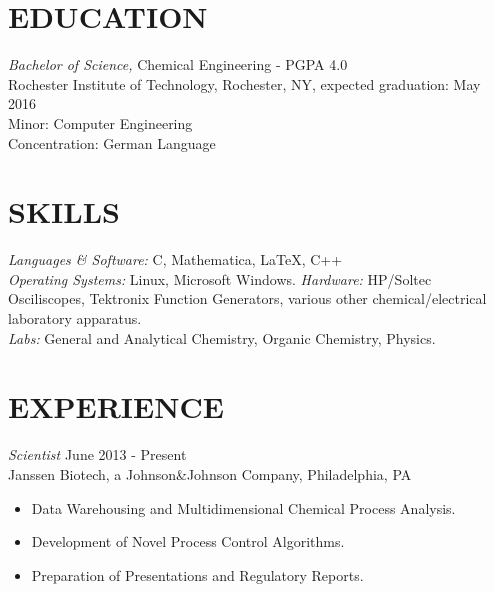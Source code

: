 \documentclass[line,margin]{res}
\begin{document}
\address{3241 Nathaniel Rochester Hall, Rochester, NY 14623}
\address{(315) 391-7268 - tmw4661@rit.edu}

\begin{resume}
 
\section{EDUCATION} {\sl Bachelor of Science,} Chemical Engineering - PGPA 4.0 \\
                Rochester Institute of Technology, Rochester, NY, 
                expected graduation: May 2016 \\
                Minor: Computer Engineering \\
                Concentration: German Language \\
\section{SKILLS} {\sl Languages \& Software:} C, Mathematica,
						\LaTeX, C++\\
                {\sl Operating Systems:} Linux, Microsoft Windows.
				{\sl Hardware:} HP/Soltec Osciliscopes, Tektronix Function Generators, various other chemical/electrical laboratory apparatus.\\
				{\sl Labs:} General and Analytical Chemistry, Organic Chemistry, Physics.

\section{EXPERIENCE} {\sl Scientist} \hfill June 2013 - Present \\
		Janssen Biotech, a Johnson\&Johnson Company,
		Philadelphia, PA
		\begin{itemize}  \itemsep -2pt
		\item   Data Warehousing and Multidimensional Chemical Process Analysis.
		\item   Development of Novel Process Control Algorithms.
		\item   Preparation of Presentations and Regulatory Reports.
		\end{itemize}


\end{resume}
\end{document}

